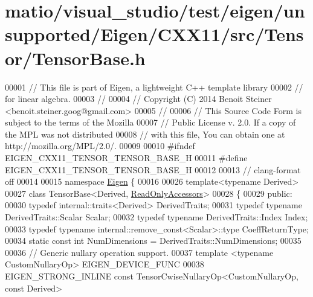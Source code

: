 \hypertarget{matio_2visual__studio_2test_2eigen_2unsupported_2_eigen_2_c_x_x11_2src_2_tensor_2_tensor_base_8h_source}{}\section{matio/visual\+\_\+studio/test/eigen/unsupported/\+Eigen/\+C\+X\+X11/src/\+Tensor/\+Tensor\+Base.h}
\label{matio_2visual__studio_2test_2eigen_2unsupported_2_eigen_2_c_x_x11_2src_2_tensor_2_tensor_base_8h_source}

\begin{DoxyCode}
00001 \textcolor{comment}{// This file is part of Eigen, a lightweight C++ template library}
00002 \textcolor{comment}{// for linear algebra.}
00003 \textcolor{comment}{//}
00004 \textcolor{comment}{// Copyright (C) 2014 Benoit Steiner <benoit.steiner.goog@gmail.com>}
00005 \textcolor{comment}{//}
00006 \textcolor{comment}{// This Source Code Form is subject to the terms of the Mozilla}
00007 \textcolor{comment}{// Public License v. 2.0. If a copy of the MPL was not distributed}
00008 \textcolor{comment}{// with this file, You can obtain one at http://mozilla.org/MPL/2.0/.}
00009 
00010 \textcolor{preprocessor}{#ifndef EIGEN\_CXX11\_TENSOR\_TENSOR\_BASE\_H}
00011 \textcolor{preprocessor}{#define EIGEN\_CXX11\_TENSOR\_TENSOR\_BASE\_H}
00012 
00013 \textcolor{comment}{// clang-format off}
00014 
00015 \textcolor{keyword}{namespace }\hyperlink{namespace_eigen}{Eigen} \{
00016 
00026 \textcolor{keyword}{template}<\textcolor{keyword}{typename} Derived>
00027 \textcolor{keyword}{class }TensorBase<Derived, \hyperlink{group__enums_gga9f93eac38eb83deb0e8dbd42ddf11d5da42865f87356ad7e585a1bfbfd1b81699}{ReadOnlyAccessors}>
00028 \{
00029   \textcolor{keyword}{public}:
00030     \textcolor{keyword}{typedef} internal::traits<Derived> DerivedTraits;
00031     \textcolor{keyword}{typedef} \textcolor{keyword}{typename} DerivedTraits::Scalar Scalar;
00032     \textcolor{keyword}{typedef} \textcolor{keyword}{typename} DerivedTraits::Index Index;
00033     \textcolor{keyword}{typedef} \textcolor{keyword}{typename} internal::remove\_const<Scalar>::type CoeffReturnType;
00034     \textcolor{keyword}{static} \textcolor{keyword}{const} \textcolor{keywordtype}{int} NumDimensions = DerivedTraits::NumDimensions;
00035 
00036     \textcolor{comment}{// Generic nullary operation support.}
00037     \textcolor{keyword}{template} <\textcolor{keyword}{typename} CustomNullaryOp> EIGEN\_DEVICE\_FUNC
00038     EIGEN\_STRONG\_INLINE \textcolor{keyword}{const} TensorCwiseNullaryOp<CustomNullaryOp, const Derived>

\end{DoxyCode}
